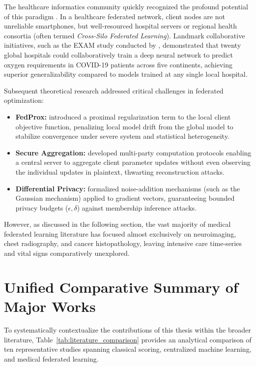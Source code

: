 \documentclass[12pt,a4paper,oneside]{report}
\begin{document}
The healthcare informatics community quickly recognized the profound potential of this paradigm \citep{rieke2020future, kaissis2020secure}. In a healthcare federated network, client nodes are not unreliable smartphones, but well-resourced hospital servers or regional health consortia (often termed \textit{Cross-Silo Federated Learning}). Landmark collaborative initiatives, such as the EXAM study conducted by \citet{dayan2021federated}, demonstrated that twenty global hospitals could collaboratively train a deep neural network to predict oxygen requirements in COVID-19 patients across five continents, achieving superior generalizability compared to models trained at any single local hospital.

Subsequent theoretical research addressed critical challenges in federated optimization:
\begin{itemize}
    \item \textbf{FedProx:} \citet{li2020federated} introduced a proximal regularization term to the local client objective function, penalizing local model drift from the global model to stabilize convergence under severe system and statistical heterogeneity.
    \item \textbf{Secure Aggregation:} \citet{bonawitz2017practical} developed multi-party computation protocols enabling a central server to aggregate client parameter updates without even observing the individual updates in plaintext, thwarting reconstruction attacks.
    \item \textbf{Differential Privacy:} \citet{dwork2014algorithmic} formalized noise-addition mechanisms (such as the Gaussian mechanism) applied to gradient vectors, guaranteeing bounded privacy budgets ($\epsilon, \delta$) against membership inference attacks.
\end{itemize}

However, as discussed in the following section, the vast majority of medical federated learning literature has focused almost exclusively on neuroimaging, chest radiography, and cancer histopathology, leaving intensive care time-series and vital signs comparatively unexplored.

\section{Unified Comparative Summary of Major Works}
\label{sec:comparative_summary}

To systematically contextualize the contributions of this thesis within the broader literature, Table~\ref{tab:literature_comparison} provides an analytical comparison of ten representative studies spanning classical scoring, centralized machine learning, and medical federated learning.
\end{document}

